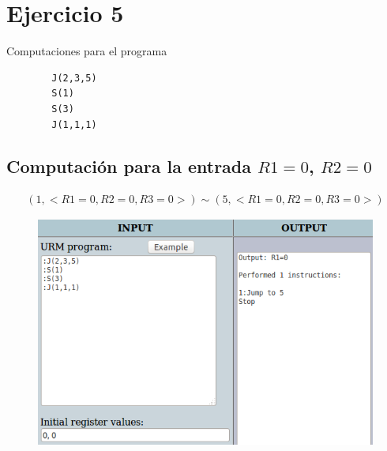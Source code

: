 \section{Ejercicio 5}
  		Computaciones para el programa
  		\begin{verbatim}
		J(2,3,5)
		S(1)
		S(3)
		J(1,1,1)
  		\end{verbatim}
  		\subsection{Computación para la entrada $R1=0$, $R2=0$}
  		\begin{equation*}\begin{gathered}
		(1, <R1=0, R2=0, R3=0>) \sim (5, <R1=0, R2=0, R3=0>)
		\end{gathered}\end{equation*}
		\begin{figure}[H]
  			\centering
  			\includegraphics[scale=0.5]{images/500.png}
  		\end{figure}
